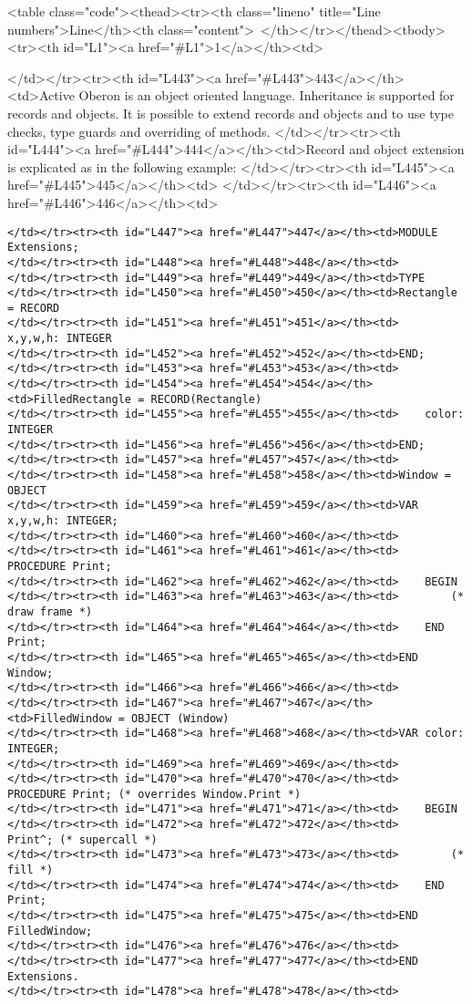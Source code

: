 <table class="code"><thead><tr><th class="lineno" title="Line numbers">Line</th><th class="content"> </th></tr></thead><tbody><tr><th id="L1"><a href="#L1">1</a></th><td>\documentclass[a4paper,11pt]{article}
\begin{document}
</td></tr><tr><th id="L443"><a href="#L443">443</a></th><td>Active Oberon is an object oriented language. Inheritance is supported for records and objects. It is possible to extend records and objects and to use type checks, type guards and overriding of methods.
</td></tr><tr><th id="L444"><a href="#L444">444</a></th><td>Record and object extension is explicated as in the following example:
</td></tr><tr><th id="L445"><a href="#L445">445</a></th><td>
</td></tr><tr><th id="L446"><a href="#L446">446</a></th><td>\begin{lstlisting}[language=Oberon,frame=none,caption=Type extension of records and objects]
</td></tr><tr><th id="L447"><a href="#L447">447</a></th><td>MODULE Extensions;
</td></tr><tr><th id="L448"><a href="#L448">448</a></th><td>
</td></tr><tr><th id="L449"><a href="#L449">449</a></th><td>TYPE
</td></tr><tr><th id="L450"><a href="#L450">450</a></th><td>Rectangle = RECORD
</td></tr><tr><th id="L451"><a href="#L451">451</a></th><td>    x,y,w,h: INTEGER
</td></tr><tr><th id="L452"><a href="#L452">452</a></th><td>END;
</td></tr><tr><th id="L453"><a href="#L453">453</a></th><td>
</td></tr><tr><th id="L454"><a href="#L454">454</a></th><td>FilledRectangle = RECORD(Rectangle)
</td></tr><tr><th id="L455"><a href="#L455">455</a></th><td>    color: INTEGER
</td></tr><tr><th id="L456"><a href="#L456">456</a></th><td>END;
</td></tr><tr><th id="L457"><a href="#L457">457</a></th><td>
</td></tr><tr><th id="L458"><a href="#L458">458</a></th><td>Window = OBJECT
</td></tr><tr><th id="L459"><a href="#L459">459</a></th><td>VAR x,y,w,h: INTEGER;
</td></tr><tr><th id="L460"><a href="#L460">460</a></th><td>
</td></tr><tr><th id="L461"><a href="#L461">461</a></th><td>    PROCEDURE Print;
</td></tr><tr><th id="L462"><a href="#L462">462</a></th><td>    BEGIN
</td></tr><tr><th id="L463"><a href="#L463">463</a></th><td>        (* draw frame *)
</td></tr><tr><th id="L464"><a href="#L464">464</a></th><td>    END Print;
</td></tr><tr><th id="L465"><a href="#L465">465</a></th><td>END Window;
</td></tr><tr><th id="L466"><a href="#L466">466</a></th><td>
</td></tr><tr><th id="L467"><a href="#L467">467</a></th><td>FilledWindow = OBJECT (Window)
</td></tr><tr><th id="L468"><a href="#L468">468</a></th><td>VAR color: INTEGER;
</td></tr><tr><th id="L469"><a href="#L469">469</a></th><td>
</td></tr><tr><th id="L470"><a href="#L470">470</a></th><td>    PROCEDURE Print; (* overrides Window.Print *)
</td></tr><tr><th id="L471"><a href="#L471">471</a></th><td>    BEGIN
</td></tr><tr><th id="L472"><a href="#L472">472</a></th><td>        Print^; (* supercall *)
</td></tr><tr><th id="L473"><a href="#L473">473</a></th><td>        (* fill *)
</td></tr><tr><th id="L474"><a href="#L474">474</a></th><td>    END Print;
</td></tr><tr><th id="L475"><a href="#L475">475</a></th><td>END FilledWindow;
</td></tr><tr><th id="L476"><a href="#L476">476</a></th><td>
</td></tr><tr><th id="L477"><a href="#L477">477</a></th><td>END Extensions.
</td></tr><tr><th id="L478"><a href="#L478">478</a></th><td>\end{lstlisting}
\end{document}
